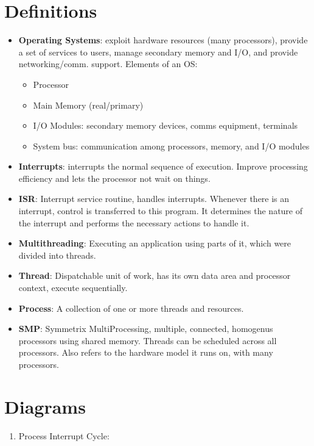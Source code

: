 \documentclass[fontsize=5pt]{scrartcl}
\begin{document}
\begin{multicols}{3}
  \section{Definitions}
    \begin{itemize}
      \item \textbf{Operating Systems}: exploit hardware resources (many processors), provide a set of services to users, manage secondary memory and I/O, %
          and provide networking/comm. support. Elements of an OS:
      \begin{itemize}
        \item Processor
        \item Main Memory (real/primary)
        \item I/O Modules: secondary memory devices, comms equipment, terminals
        \item System bus: communication among processors, memory, and I/O modules
       \end{itemize}
       \item \textbf{Interrupts}: interrupts the normal sequence of execution. Improve processing efficiency and lets the processor not wait on things.
       \item \textbf{ISR}: Interrupt service routine, handles interrupts. Whenever  there is an interrupt, control is transferred to this program.  %
                       It determines the nature of the interrupt and performs the necessary actions to handle it.
       \item \textbf{Multithreading}: Executing an application using parts of it, which were divided into threads. 
       \item \textbf{Thread}: Dispatchable unit of work, has its own data area and processor context, execute sequentially.
       \item \textbf{Process}: A collection of one or more threads and resources.
       \item \textbf{SMP}: Symmetrix MultiProcessing, multiple, connected, homogenus processors using shared memory.
                           Threads can be scheduled across all processors. Also refers to the hardware model it runs on, with
                           many processors.
                          
    \end{itemize}

  \section{Diagrams}
    \begin{enumerate}
      \item Process Interrupt Cycle: 
    \end{enumerate}
    

\end{multicols}
\end{document}
